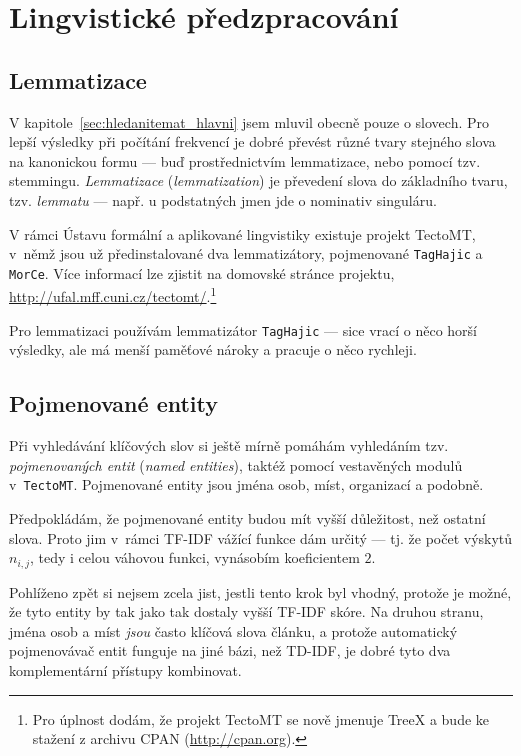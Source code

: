 \documentclass[12pt,a4paper]{report}
\begin{document}
\section{Lingvistické předzpracování}

\subsection{Lemmatizace}

V kapitole~\ref{sec:hledanitemat_hlavni} jsem mluvil obecně pouze o slovech. Pro lepší výsledky při počítání frekvencí je dobré převést různé tvary stejného slova na kanonickou formu --- buď prostřednictvím lemmatizace, nebo pomocí tzv. stemmingu. \emph{Lemmatizace} (\emph{lemmatization}) je převedení slova do základního tvaru, tzv. \emph{lemmatu} --- např. u podstatných jmen jde o nominativ singuláru.

V rámci Ústavu formální a aplikované lingvistiky existuje projekt TectoMT, v~němž jsou už předinstalované dva lemmatizátory, pojmenované \texttt{TagHajic} a \texttt{MorCe}. Více informací lze zjistit na domovské stránce projektu, \url{http://ufal.mff.cuni.cz/tectomt/}.\footnote{Pro úplnost dodám, že projekt TectoMT se nově jmenuje TreeX a bude ke stažení z archivu CPAN (\url{http://cpan.org}).}

Pro lemmatizaci používám lemmatizátor \texttt{TagHajic} --- sice vrací o něco horší výsledky, ale má menší paměťové nároky a pracuje o něco rychleji.

\subsection{Pojmenované entity}
Při vyhledávání klíčových slov si ještě mírně pomáhám vyhledáním tzv. \emph{pojmenovaných entit} (\emph{named entities}), taktéž pomocí vestavěných modulů v~\texttt{TectoMT}. Pojmenované entity jsou jména osob, míst, organizací a podobně.

Předpokládám, že pojmenované entity budou mít vyšší důležitost, než ostatní slova. Proto jim v~rámci TF-IDF vážící funkce dám určitý  --- tj. že počet výskytů $n_{i,j}$, tedy i celou váhovou funkci, vynásobím koeficientem $2$.

Pohlíženo zpět si nejsem zcela jist, jestli tento krok byl vhodný, protože je možné, že tyto entity by tak jako tak dostaly vyšší TF-IDF skóre. Na druhou stranu, jména osob a míst \emph{jsou} často klíčová slova článku, a protože automatický pojmenovávač entit funguje na jiné bázi, než TD-IDF, je dobré tyto dva komplementární přístupy kombinovat.
\end{document}
